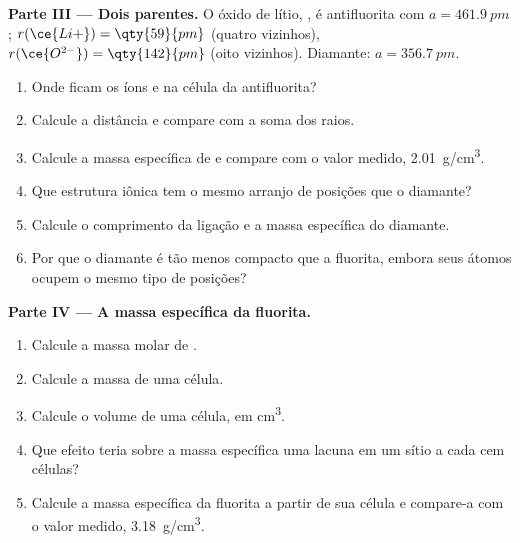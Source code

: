 \begin{problem}
\medskip
\noindent\textbf{Parte III --- Dois parentes.}
O óxido de lítio, , é antifluorita com $a = \qty{461.9}{pm}$;
$r(\ce{Li+}) = \qty{59}{pm}$ (quatro vizinhos), $r(\ce{O^{2-}}) =
\qty{142}{pm}$ (oito vizinhos). Diamante: $a = \qty{356.7}{pm}$.
\begin{enumerate}[resume]
  \item Onde ficam os íons  e  na célula da
        antifluorita?
  \item Calcule a distância  e compare com a soma dos raios.
  \item Calcule a massa específica de  e compare com o valor
        medido, \qty{2.01}{g/cm^3}.
  \item Que estrutura iônica tem o mesmo arranjo de posições que o
        diamante?
  \item Calcule o comprimento da ligação  e a massa específica
        do diamante.
  \item Por que o diamante é tão menos compacto que a fluorita, embora
        seus átomos ocupem o mesmo tipo de posições?
\end{enumerate}

\medskip
\noindent\textbf{Parte IV --- A massa específica da fluorita.}
\begin{enumerate}[resume]
  \item Calcule a massa molar de .
  \item Calcule a massa de uma célula.
  \item Calcule o volume de uma célula, em \unit{cm^3}.
  \item Que efeito teria sobre a massa específica uma lacuna em um sítio
         a cada cem células?
  \item Calcule a massa específica da fluorita a partir de sua célula e
        compare-a com o valor medido, \qty{3.18}{g/cm^3}.
\end{enumerate}
\end{problem}

